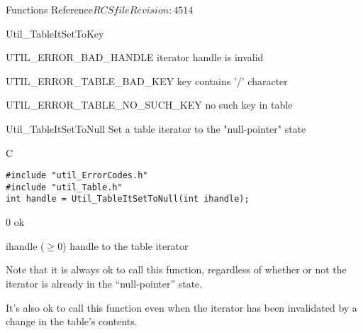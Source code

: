 \begin{cactuspart}{ Functions Reference}{$RCSfile$}{$Revision: 4514 $}
\begin{FunctionDescription}{Util\_TableItSetToKey}
\begin{ErrorSection}
\begin{Error}{UTIL\_ERROR\_BAD\_HANDLE}
iterator handle is invalid
\end{Error}
\begin{Error}{UTIL\_ERROR\_TABLE\_BAD\_KEY}
key contains '/' character
\end{Error}
\begin{Error}{UTIL\_ERROR\_TABLE\_NO\_SUCH\_KEY}
no such key in table
\end{Error}
\end{ErrorSection}
\end{FunctionDescription}


\begin{FunctionDescription}{Util\_TableItSetToNull}
\label{Util-TableItSetToNull}
Set a table iterator to the "null-pointer" state

\begin{SynopsisSection}
\begin{Synopsis}{C}
\begin{verbatim}
#include "util_ErrorCodes.h"
#include "util_Table.h"
int handle = Util_TableItSetToNull(int ihandle);
\end{verbatim}
\end{Synopsis}
\end{SynopsisSection}

\begin{ResultSection}
\begin{Result}{\rm 0}
ok
\end{Result}
\end{ResultSection}

\begin{ParameterSection}
\begin{Parameter}{ihandle ($\ge 0$)}
handle to the table iterator
\end{Parameter}
\end{ParameterSection}

\begin{Discussion}
Note that it is always ok to call this function, regardless of
whether or not the iterator is already in the ``null-pointer'' state.

It's also ok to call this function even when the iterator has been
invalidated by a change in the table's contents.
\end{Discussion}


\end{FunctionDescription}
\end{cactuspart}
